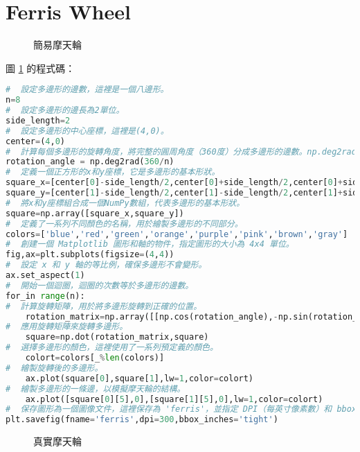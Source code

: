 \section{Ferris Wheel}
\begin{figure}[H]
    \caption{簡易摩天輪}
    \label{fig:ferriswheel_1}
\end{figure}
圖 \ref{fig:ferriswheel_1} 的程式碼：
\begin{lstlisting}[language=Python]
#  設定多邊形的邊數，這裡是一個八邊形。
n=8
#  設定多邊形的邊長為2單位。
side_length=2  
#  設定多邊形的中心座標，這裡是(4,0)。
center=(4,0)  
#  計算每個多邊形的旋轉角度，將完整的圓周角度（360度）分成多邊形的邊數。np.deg2rad 函數用於將度數轉換為弧度。
rotation_angle = np.deg2rad(360/n) 
#  定義一個正方形的x和y座標，它是多邊形的基本形狀。
square_x=[center[0]-side_length/2,center[0]+side_length/2,center[0]+side_length/2,center[0]-side_length/2,center[0]-side_length/2,center[0]-side_length/2]
square_y=[center[1]-side_length/2,center[1]-side_length/2,center[1]+side_length/2,center[1]+side_length/2,center[1]-side_length/2,center[1]]
#  將x和y座標組合成一個NumPy數組，代表多邊形的基本形狀。
square=np.array([square_x,square_y])
#  定義了一系列不同顏色的名稱，用於繪製多邊形的不同部分。
colors=['blue','red','green','orange','purple','pink','brown','gray']
#  創建一個 Matplotlib 圖形和軸的物件，指定圖形的大小為 4x4 單位。
fig,ax=plt.subplots(figsize=(4,4))
#  設定 x 和 y 軸的等比例，確保多邊形不會變形。
ax.set_aspect(1)
#  開始一個迴圈，迴圈的次數等於多邊形的邊數。
for_in range(n):
#  計算旋轉矩陣，用於將多邊形旋轉到正確的位置。
    rotation_matrix=np.array([[np.cos(rotation_angle),-np.sin(rotation_angle)],[np.sin(rotation_angle), np.cos(rotation_angle)]])
#  應用旋轉矩陣來旋轉多邊形。
    square=np.dot(rotation_matrix,square)
#  選擇多邊形的顏色，這裡使用了一系列預定義的顏色。
    colort=colors[_%len(colors)]
#  繪製旋轉後的多邊形。
    ax.plot(square[0],square[1],lw=1,color=colort)
#  繪製多邊形的一條邊，以模擬摩天輪的結構。
    ax.plot([square[0][5],0],[square[1][5],0],lw=1,color=colort)
#  保存圖形為一個圖像文件，這裡保存為 'ferris'，並指定 DPI（每英寸像素數）和 bbox（用於確保圖形不被裁切）。
plt.savefig(fname='ferris',dpi=300,bbox_inches='tight')
\end{lstlisting}
\begin{figure}[H]
    \caption{真實摩天輪}
    \label{fig:ferriswheel_2}
\end{figure}
